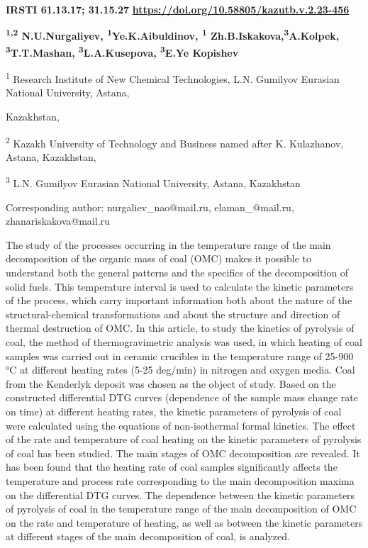 \newpage
{\bfseries IRSTI 61.13.17; 31.15.27}
\hfill {\bfseries \href{https://doi.org/10.58805/kazutb.v.2.23-456}{https://doi.org/10.58805/kazutb.v.2.23-456}}


\begin{center}
{\bfseries \textsuperscript{1,2} N.U.Nurgaliyev, \textsuperscript{1}Ye.K.Aibuldinov, \textsuperscript{1} Zh.B.Iskakova,\textsuperscript{3}A.Kolpek, \textsuperscript{3}T.T.Mashan, \textsuperscript{3}L.A.Kusepova, \textsuperscript{3}E.Ye Kopishev}

\textsuperscript{1} Research Institute of New Chemical Technologies,
L.N. Gumilyov Eurasian National University, Astana,

Kazakhstan,

\textsuperscript{2} Kazakh University of Technology and Business named
after K. Kulazhanov, Astana, Kazakhstan,

\textsuperscript{3} L.N. Gumilyov Eurasian National University, Astana,
Kazakhstan

Corresponding author: nurgaliev\_nao@mail.ru, elaman\_@mail.ru,
zhanariskakova@mail.ru
\end{center}

The study of the processes occurring in the temperature range of the
main decomposition of the organic mass of coal (OMC) makes it possible
to understand both the general patterns and the specifics of the
decomposition of solid fuels. This temperature interval is used to
calculate the kinetic parameters of the process, which carry important
information both about the nature of the structural-chemical
transformations and about the structure and direction of thermal
destruction of OMC. In this article, to study the kinetics of pyrolysis
of coal, the method of thermogravimetric analysis was used, in which
heating of coal samples was carried out in ceramic crucibles in the
temperature range of 25-900 °C at different heating rates (5-25 deg/min)
in nitrogen and oxygen media. Coal from the Kenderlyk deposit was chosen
as the object of study. Based on the constructed differential DTG curves
(dependence of the sample mass change rate on time) at different heating
rates, the kinetic parameters of pyrolysis of coal were calculated using
the equations of non-isothermal formal kinetics. The effect of the rate
and temperature of coal heating on the kinetic parameters of pyrolysis
of coal has been studied. The main stages of OMC decomposition are
revealed. It has been found that the heating rate of coal samples
significantly affects the temperature and process rate corresponding to
the main decomposition maxima on the differential DTG curves. The
dependence between the kinetic parameters of pyrolysis of coal in the
temperature range of the main decomposition of OMC on the rate and
temperature of heating, as well as between the kinetic parameters at
different stages of the main decomposition of coal, is analyzed.

